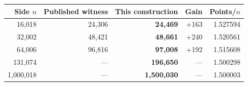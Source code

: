 \small\begin{tabular}{r r r r r}
\toprule Side $n$ & Published witness & This construction & Gain & Points/$n$\\\midrule
16,018 & 24,306 & \textbf{24,469} & +163 & 1.527594\\
32,002 & 48,421 & \textbf{48,661} & +240 & 1.520561\\
64,006 & 96,816 & \textbf{97,008} & +192 & 1.515608\\
131,074 & --- & \textbf{196,650} & --- & 1.500298\\
1,000,018 & --- & \textbf{1,500,030} & --- & 1.500003\\
\bottomrule\end{tabular}
